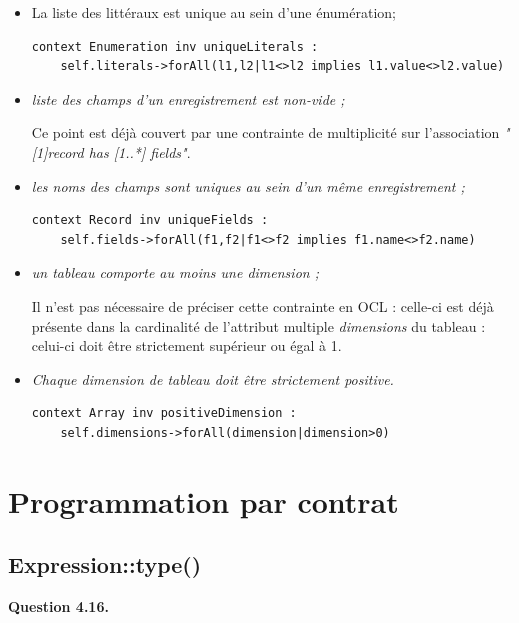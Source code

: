 \documentclass[oneside,a4paper]{book}
\begin{document}
\begin{itemize}
    \item La liste des littéraux est unique au sein d'une énumération;
    \begin{lstlisting}
context Enumeration inv uniqueLiterals :
    self.literals->forAll(l1,l2|l1<>l2 implies l1.value<>l2.value)
    \end{lstlisting}
    
    \item \textit{liste des champs d'un enregistrement est non-vide ; }
    
    Ce point est déjà couvert par une contrainte de multiplicité sur l'association \textit{"[1]record has [1..*] fields"}.
    
    \item \textit{les noms des champs sont uniques au sein d'un même enregistrement ;}
    \begin{lstlisting}
context Record inv uniqueFields : 
    self.fields->forAll(f1,f2|f1<>f2 implies f1.name<>f2.name)
    \end{lstlisting}
    
    \item \textit{un tableau comporte au moins une dimension ;}
    
    Il n'est pas nécessaire de préciser cette contrainte en OCL : celle-ci est déjà présente dans la cardinalité de l'attribut multiple \textit{dimensions} du tableau : celui-ci doit être strictement supérieur ou égal à 1.
    
    
    \item \textit{Chaque dimension de tableau doit être strictement positive.}
    \begin{lstlisting}
context Array inv positiveDimension : 
    self.dimensions->forAll(dimension|dimension>0)
    \end{lstlisting}
    
\end{itemize}

\section{Programmation par contrat}

\subsection{Expression::type()}

\textbf{Question 4.16.}\label{Question 4.16.}\newline
\end{document}
